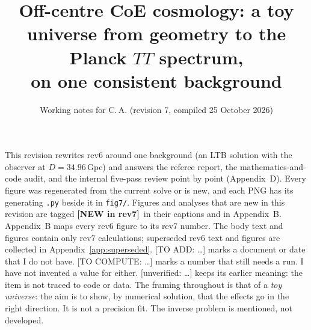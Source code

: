 \documentclass[11pt]{article}
\title{Off-centre CoE cosmology: a toy universe from geometry to the Planck $TT$ spectrum,\\ on one consistent background}
\author{Working notes for C.\,A. \quad (revision 7, compiled 25 October 2026)}
\date{}
\newcommand{\NEW}{\textbf{[NEW in rev7]}\ }
\newcommand{\flag}[1]{\textsf{[unverified: #1]}}
\newcommand{\todo}[1]{\textsf{[#1]}}
\begin{document}
\maketitle
\tableofcontents
\bigskip
\begin{tcolorbox}[colback=gray!6,colframe=gray!50,title=Reading this draft]
\small This revision rewrites rev6 around one background (an LTB solution with the observer at $D=34.96$\,Gpc) and answers the referee report, the mathematics-and-code audit, and the internal five-pass review point by point (Appendix~D). Every figure was regenerated from the current solve or is new, and each PNG has its generating \texttt{.py} beside it in \texttt{fig7/}. Figures and analyses that are new in this revision are tagged \NEW in their captions and in Appendix~B. Appendix~B maps every rev6 figure to its rev7 number. The body text and figures contain only rev7 calculations; superseded rev6 text and figures are collected in Appendix~\ref{app:superseded}. \todo{TO ADD: \ldots} marks a document or date that I do not have. \todo{TO COMPUTE: \ldots} marks a number that still needs a run. I have not invented a value for either. \flag{\ldots} keeps its earlier meaning: the item is not traced to code or data. The framing throughout is that of a \emph{toy universe}: the aim is to show, by numerical solution, that the effects go in the right direction. It is not a precision fit. The inverse problem is mentioned, not developed.
\end{tcolorbox}
\end{document}
